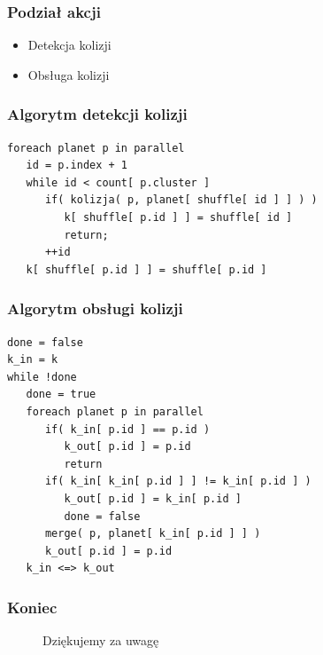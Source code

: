 \documentclass{beamer}
\begin{document}
\frame
{
	\frametitle{Podział akcji}
	\begin{itemize}
		\item Detekcja kolizji
		\item Obsługa kolizji
	\end{itemize}
}

\begin{frame}[fragile]
	\frametitle{Algorytm detekcji kolizji}

	\begin{verbatim}
foreach planet p in parallel
   id = p.index + 1
   while id < count[ p.cluster ]
      if( kolizja( p, planet[ shuffle[ id ] ] ) )
         k[ shuffle[ p.id ] ] = shuffle[ id ]
         return;
      ++id
   k[ shuffle[ p.id ] ] = shuffle[ p.id ]
	\end{verbatim}
\end{frame}

\begin{frame}[fragile]
	\frametitle{Algorytm obsługi kolizji}
	\begin{verbatim}
done = false
k_in = k
while !done
   done = true
   foreach planet p in parallel   
      if( k_in[ p.id ] == p.id )
         k_out[ p.id ] = p.id
         return
      if( k_in[ k_in[ p.id ] ] != k_in[ p.id ] )
         k_out[ p.id ] = k_in[ p.id ]
         done = false
      merge( p, planet[ k_in[ p.id ] ] )
      k_out[ p.id ] = p.id
   k_in <=> k_out
   \end{verbatim}
\end{frame}

\frame
{
	\frametitle{Koniec}
	\begin{figure}
		\centering Dziękujemy za uwagę
	\end{figure}
	\setcounter{subfigure}{0}
}
\end{document}
